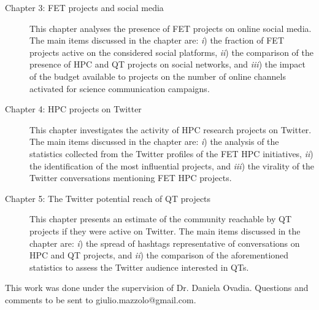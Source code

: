 \begin{description}
 \item[Chapter 3: FET projects and social media] This chapter analyses the presence of FET projects on online social media. The main items discussed in the chapter are: \emph{i}) the fraction of FET projects active on the considered social platforms, \emph{ii}) the comparison of the presence of HPC and QT projects on social networks, and \emph{iii}) the impact of the budget available to projects on the number of online channels activated for science communication campaigns.

 \item[Chapter 4: HPC projects on Twitter] This chapter investigates the activity of HPC research projects on Twitter. The main items discussed in the chapter are: \emph{i}) the analysis of the statistics collected from the Twitter profiles of the FET HPC initiatives, \emph{ii}) the identification of the most influential projects, and \emph{iii}) the virality of the Twitter conversations mentioning FET HPC projects.

 \item[Chapter 5: The Twitter potential reach of QT projects] This chapter presents an estimate of the community reachable by QT projects if they were active on Twitter. The main items discussed in the chapter are: \emph{i}) the spread of hashtags representative of conversations on HPC and QT projects, and \emph{ii}) the comparison of the aforementioned statistics to assess the Twitter audience interested in QTs.
\end{description}

\noindent
This work was done under the supervision of Dr. Daniela Ovadia. Questions and comments to be sent to giulio.mazzolo@gmail.com.